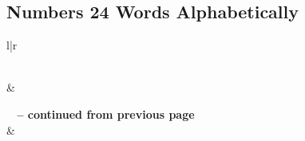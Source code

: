 

\subsection{Numbers 24 Words Alphabetically}


\normalsize
 
\begin{center}
\begin{longtable}{l|r}
\caption[Numbers 24 Words Alphabetically]{Numbers 24 Words Alphabetically}\label{table:WordsAlphabetically for Numbers 24} \\
\hline {} &  \\ \hline 
\endfirsthead
 
{{\bfseries \tablename\ \thetable{} -- continued from previous page}} \\  
\hline {} &  \\ \hline 
\endhead
 

\end{longtable}
\end{center}
